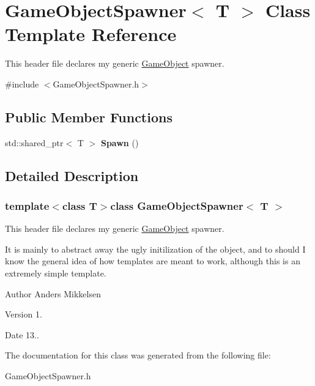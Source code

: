 \hypertarget{class_game_object_spawner}{}\section{Game\+Object\+Spawner$<$ T $>$ Class Template Reference}
\label{class_game_object_spawner}


This header file declares my generic \hyperlink{class_game_object}{Game\+Object} spawner.  




{\ttfamily \#include $<$Game\+Object\+Spawner.\+h$>$}

\subsection*{Public Member Functions}
\begin{DoxyCompactItemize}
\item 
\hypertarget{class_game_object_spawner_a59b7bb2a3d0805dd286373d2f54df110}{}std\+::shared\+\_\+ptr$<$ T $>$ {\bfseries Spawn} ()\label{class_game_object_spawner_a59b7bb2a3d0805dd286373d2f54df110}

\end{DoxyCompactItemize}


\subsection{Detailed Description}
\subsubsection*{template$<$class T$>$class Game\+Object\+Spawner$<$ T $>$}

This header file declares my generic \hyperlink{class_game_object}{Game\+Object} spawner. 

It is mainly to abstract away the ugly initilization of the object, and to should I know the general idea of how templates are meant to work, although this is an extremely simple template.

\begin{DoxyAuthor}{Author}
Anders Mikkelsen 
\end{DoxyAuthor}
\begin{DoxyVersion}{Version}
1. 
\end{DoxyVersion}
\begin{DoxyDate}{Date}
13.. 
\end{DoxyDate}


The documentation for this class was generated from the following file\+:\begin{DoxyCompactItemize}
\item 
Game\+Object\+Spawner.\+h\end{DoxyCompactItemize}
